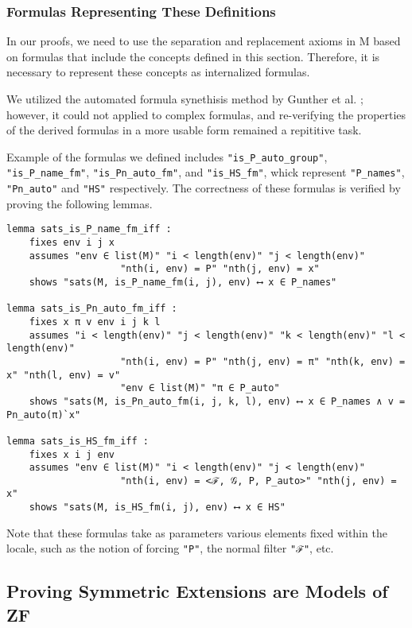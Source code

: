 \documentclass{report}
\newenvironment{isaframe}{\begin{mdframed}[topline=false, rightline=false, bottomline=false]}{\end{mdframed}}
\begin{document}
\subsubsection{Formulas Representing These Definitions}
In our proofs, we need to use the separation and replacement axioms in M
based on formulas that include the concepts defined in this section.
Therefore, it is necessary to represent these concepts as internalized formulas.

We utilized the automated formula synethisis method by Gunther et al. \cite{gunther_forcing};
however, it could not applied to complex formulas, 
and re-verifying the properties of the derived formulas in a more usable form remained a repititive task.

Example of the formulas we defined includes \texttt{"is\_P\_auto\_group"}, \texttt{"is\_P\_name\_fm"}, \texttt{"is\_Pn\_auto\_fm"}, and \texttt{"is\_HS\_fm"},
whick represent \texttt{"P\_names"}, \texttt{"Pn\_auto"} and \texttt{"HS"} respectively.
The correctness of these formulas is verified by proving the following lemmas. 

\begin{isaframe}
\begin{verbatim}
lemma sats_is_P_name_fm_iff : 
    fixes env i j x 
    assumes "env ∈ list(M)" "i < length(env)" "j < length(env)" 
                    "nth(i, env) = P" "nth(j, env) = x"  
    shows "sats(M, is_P_name_fm(i, j), env) ⟷ x ∈ P_names" 

lemma sats_is_Pn_auto_fm_iff :
    fixes x π v env i j k l
    assumes "i < length(env)" "j < length(env)" "k < length(env)" "l < length(env)" 
                    "nth(i, env) = P" "nth(j, env) = π" "nth(k, env) = x" "nth(l, env) = v" 
                    "env ∈ list(M)" "π ∈ P_auto" 
    shows "sats(M, is_Pn_auto_fm(i, j, k, l), env) ⟷ x ∈ P_names ∧ v = Pn_auto(π)`x" 

lemma sats_is_HS_fm_iff : 
    fixes x i j env 
    assumes "env ∈ list(M)" "i < length(env)" "j < length(env)" 
                    "nth(i, env) = <ℱ, 𝒢, P, P_auto>" "nth(j, env) = x" 
    shows "sats(M, is_HS_fm(i, j), env) ⟷ x ∈ HS" 
\end{verbatim}
\end{isaframe}

Note that these formulas take as parameters various elements fixed within the locale, 
such as the notion of forcing \texttt{"P"}, the normal filter \texttt{"ℱ"}, etc.

\subsection{Proving Symmetric Extensions are Models of ZF}
\end{document}
